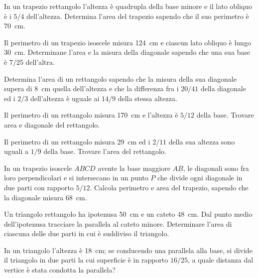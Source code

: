 \begin{multicols}{2}
\begin{esercizio}
\label{ese:7.65}
In un trapezio rettangolo l'altezza è quadrupla della base minore e 
il lato obliquo è i $5/4$ dell'altezza. Determina l'area del trapezio 
sapendo che il suo perimetro è 70~cm.
\end{esercizio}

\begin{esercizio}
\label{ese:7.66}
Il perimetro di un trapezio isoscele misura 124~cm e ciascun lato 
obliquo è lungo 30~cm. Determinane l'area e la misura della diagonale 
sapendo che una sua base è $7/25$ dell'altra.
\end{esercizio}

\begin{esercizio}
\label{ese:7.67}
Determina l'area di un rettangolo sapendo che la misura della sua 
diagonale supera di 8~cm quella dell'altezza e che la differenza fra 
i $20/41$ della diagonale ed i $2/3$ dell'altezza è uguale ai $14/9$ 
della stessa altezza.
\end{esercizio}

\begin{esercizio}
\label{ese:7.68}
Il perimetro di un rettangolo misura 170~cm e l'altezza è $5/12$ 
della base. Trovare area e diagonale del rettangolo.
\end{esercizio}

\begin{esercizio}
\label{ese:7.69}
Il perimetro di un rettangolo misura 29~cm ed i $2/11$ della sua 
altezza sono uguali a $1/9$ della base. Trovare l'area del rettangolo.
\end{esercizio}

\begin{esercizio}
\label{ese:7.70}
In un trapezio isoscele $ABCD$ avente la base maggiore $AB$, le 
diagonali sono fra loro perpendicolari e si intersecano in un punto 
$P$ che divide ogni diagonale in due parti con rapporto $5/12$. 
Calcola perimetro e area del trapezio, sapendo che la diagonale 
misura 68~cm.
\end{esercizio}

\begin{esercizio}
\label{ese:7.71}
Un triangolo rettangolo ha ipotenusa 50~cm e un cateto 48~cm. Dal 
punto medio dell'ipotenusa tracciare la parallela al cateto minore. 
Determinare l'area di ciascuna delle due parti in cui è suddiviso il 
triangolo.
\end{esercizio}

\begin{esercizio}
\label{ese:7.72}
In un triangolo l'altezza è 18~cm; se conducendo una parallela alla 
base, si divide il triangolo in due parti la cui superficie è in 
rapporto $16/25$, a quale distanza dal vertice è stata condotta la 
parallela?
\end{esercizio}


\end{multicols}
